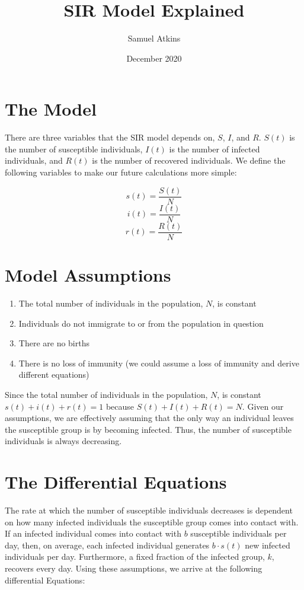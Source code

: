 \documentclass{article}
\title{\vspace{70mm}\textbf{SIR Model Explained}}
\author{Samuel Atkins}
\date{December 2020}
\begin{document}
\maketitle
\pagebreak
\section{The Model}
There are three variables that the SIR model depends on, $S$, $I$, and $R$. $S(t)$ is the number of susceptible individuals, $I(t)$ is the number of infected individuals, and $R(t)$ is the number of recovered individuals. We define the following variables to make our future calculations more simple:

\[s(t) = \frac{S(t)}{N}\]
\[i(t) = \frac{I(t)}{N}\]
\[r(t) = \frac{R(t)}{N}\]

\section{Model Assumptions}
\begin{enumerate}[label=\arabic*.]
\item The total number of individuals in the population, $N$, is constant
\item Individuals do not immigrate to or from the population in question
\item There are no births
\item There is no loss of immunity (we could assume a loss of immunity and derive different equations)

\end{enumerate}
Since the total number of individuals in the population, $N$, is constant $s(t) + i(t) + r(t) = 1$ because $S(t) + I(t) + R(t) = N$. Given our assumptions, we are effectively assuming that the only way an individual leaves the susceptible group is by becoming infected. Thus, the number of susceptible individuals is always decreasing. 

\section{The Differential Equations}
The rate at which the number of susceptible individuals decreases is dependent on how many infected individuals the susceptible group comes into contact with. If an infected individual comes into contact with $b$ susceptible individuals per day, then, on average, each infected individual generates $b \cdot s(t)$ new infected individuals per day. Furthermore, a fixed fraction of the infected group, $k$, recovers every day. Using these assumptions, we arrive at the following differential Equations:
\end{document}
